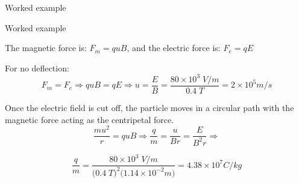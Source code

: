 {\begin{frame}{Worked example}
\end{frame}

%
%
%

\begin{frame}{Worked example}

The magnetic force is: $\displaystyle   F_m = q u B $,
and the electric force is:  $\displaystyle  F_e = q E $\\
\vspace{0.2cm}

For no deflection:
\begin{equation*}
   F_m = F_e  \Rightarrow
   quB = qE  \Rightarrow
    u = \frac{E}{B} =
      \frac{80 \times 10^3 \; V/m}{0.4 \; T} = 2 \times 10^5 m/s
\end{equation*}

Once the electric field is cut off,
the particle moves in a circular path with
the magnetic force acting as the centripetal force.
\begin{equation*}
   \frac{mu^2}{r} = quB  \Rightarrow
    \frac{q}{m} = \frac{u}{Br} = \frac{E}{B^2 r}  \Rightarrow
\end{equation*}

\begin{equation*}
   \frac{q}{m} =
       \frac{80 \times 10^3 \; V/m}{\Big( 0.4 \; T\Big)^2 \Big( 1.14 \times 10^{-2} m\Big)} =
       4.38 \times 10^{7} C/kg
\end{equation*}

\end{frame}


} %



%
%

